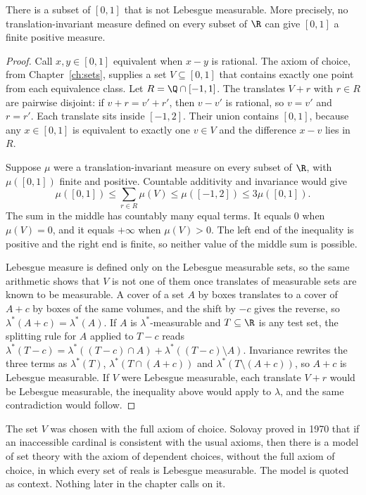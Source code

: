 \begin{theorem}[Vitali, 1905]\label{thm:vitali6}
There is a subset of $[0,1]$ that is not Lebesgue measurable.
More precisely, no translation-invariant measure defined on every subset of $\R$ can give $[0,1]$ a finite positive measure.
\end{theorem}
\begin{proof}
Call $x,y\in[0,1]$ equivalent when $x-y$ is rational.
The axiom of choice, from Chapter~\ref{ch:sets}, supplies a set $V\subseteq[0,1]$ that contains exactly one point from each equivalence class.
Let $R=\Q\cap[-1,1]$.
The translates $V+r$ with $r\in R$ are pairwise disjoint: if $v+r=v'+r'$, then $v-v'$ is rational, so $v=v'$ and $r=r'$.
Each translate sits inside $[-1,2]$.
Their union contains $[0,1]$, because any $x\in[0,1]$ is equivalent to exactly one $v\in V$ and the difference $x-v$ lies in $R$.

Suppose $\mu$ were a translation-invariant measure on every subset of $\R$, with $\mu([0,1])$ finite and positive.
Countable additivity and invariance would give
\[
\mu([0,1])\le\sum_{r\in R}\mu(V)\le\mu([-1,2])\le 3\mu([0,1]).
\]
The sum in the middle has countably many equal terms.
It equals $0$ when $\mu(V)=0$, and it equals $+\infty$ when $\mu(V)>0$.
The left end of the inequality is positive and the right end is finite, so neither value of the middle sum is possible.

Lebesgue measure is defined only on the Lebesgue measurable sets, so the same arithmetic shows that $V$ is not one of them once translates of measurable sets are known to be measurable.
A cover of a set $A$ by boxes translates to a cover of $A+c$ by boxes of the same volumes, and the shift by $-c$ gives the reverse, so $\lambda^*(A+c)=\lambda^*(A)$.
If $A$ is $\lambda^*$-measurable and $T\subseteq\R$ is any test set, the splitting rule for $A$ applied to $T-c$ reads $\lambda^*(T-c)=\lambda^*((T-c)\cap A)+\lambda^*((T-c)\setminus A)$.
Invariance rewrites the three terms as $\lambda^*(T)$, $\lambda^*(T\cap(A+c))$ and $\lambda^*(T\setminus(A+c))$, so $A+c$ is Lebesgue measurable.
If $V$ were Lebesgue measurable, each translate $V+r$ would be Lebesgue measurable, the inequality above would apply to $\lambda$, and the same contradiction would follow.
\end{proof}

The set $V$ was chosen with the full axiom of choice.
Solovay proved in 1970 that if an inaccessible cardinal is consistent with the usual axioms, then there is a model of set theory with the axiom of dependent choices, without the full axiom of choice, in which every set of reals is Lebesgue measurable.
The model is quoted as context.
Nothing later in the chapter calls on it.

